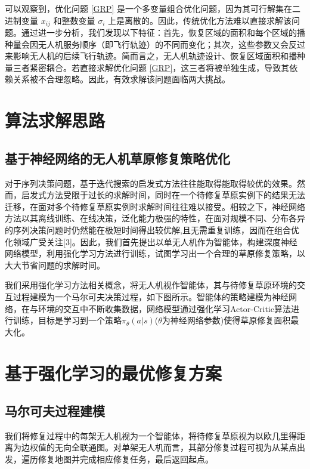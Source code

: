 \documentclass[AutoFakeBold]{LZUThesis}
\begin{document}
可以观察到，优化问题 \eqref{GRP} 是一个多变量组合优化问题，因为其可行解集在二进制变量 $x_{ij}$ 和整数变量 $\sigma_i$ 上是离散的。因此，传统优化方法难以直接求解该问题。通过进一步分析，我们发现以下特征：首先，恢复区域的面积和每个区域的播种量会因无人机服务顺序（即飞行轨迹）的不同而变化；其次，这些参数又会反过来影响无人机的后续飞行轨迹。简而言之，无人机轨迹设计、恢复区域面积和播种量三者紧密耦合。若直接求解优化问题 \eqref{GRP}，这三者将被单独生成，导致其依赖关系被不合理忽略。因此，有效求解该问题面临两大挑战。

\chapter{算法求解思路}

\section{基于神经网络的无人机草原修复策略优化}

对于序列决策问题，基于迭代搜索的启发式方法往往能取得能取得较优的效果\cite{feng2015memes}。然而，启发式方法受限于过长的求解时间，同时在一个待修复草原实例下的结果无法迁移，在面对多个待修复草原实例时求解时间往往难以接受。相较之下，神经网络方法以其离线训练、在线决策，泛化能力极强的特性，在面对规模不同、分布各异的序列决策问题时仍然能在极短时间得出较优解,且无需重复训练，因而在组合优化领域广受关注[3]。因此，我们首先提出以单无人机作为智能体，构建深度神经网络模型，利用强化学习方法进行训练，试图学习出一个合理的草原修复策略，以大大节省问题的求解时间。

我们采用强化学习方法相关概念，将无人机视作智能体，其与待修复草原环境的交互过程建模为一个马尔可夫决策过程，如下图所示。智能体的策略建模为神经网络，在与环境的交互中不断收集数据，网络模型通过强化学习Actor-Critic算法进行训练，目标是学习到一个策略$\pi_\theta(a|s)$($\theta$为神经网络参数)使得草原修复面积最大化。

\chapter{基于强化学习的最优修复方案}

\section{马尔可夫过程建模}
我们将修复过程中的每架无人机视为一个智能体，将待修复草原视为以欧几里得距离为边权值的无向全联通图。对单架无人机而言，其部分修复过程可视为从某点出发，遍历修复地图并完成相应修复任务，最后返回起点。
\end{document}
